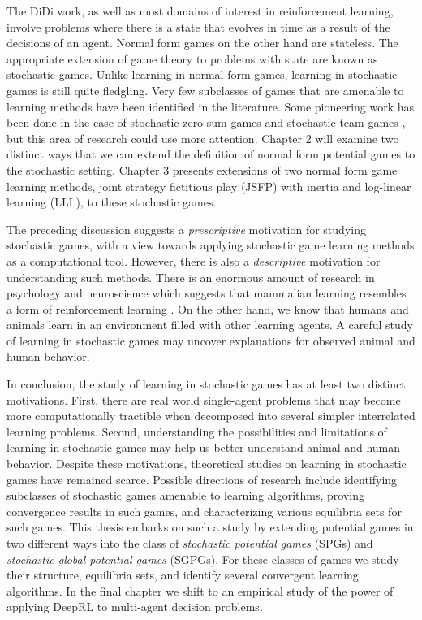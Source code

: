 The DiDi work, as well as most domains of interest in reinforcement learning, involve problems where there is a state that evolves in time as a result of the decisions of an agent. Normal form games on the other hand are stateless. The appropriate extension of game theory to problems with state are known as stochastic games. Unlike learning in normal form games, learning in stochastic games is still quite fledgling. Very few subclasses of games that are amenable to learning methods have been identified in the literature. Some pioneering work has been done in the case of stochastic zero-sum games \cite{zerosumstochastic} and stochastic team games \cite{arslan2016decentralized}, but this area of research could use more attention. Chapter 2 will examine two distinct ways that we can extend the definition of normal form potential games to the stochastic setting. Chapter 3 presents extensions of two normal form game learning methods, joint strategy fictitious play (JSFP) with inertia and log-linear learning (LLL), to these stochastic games.  


The preceding discussion suggests a {\em prescriptive} motivation for studying stochastic games, with a view towards applying stochastic game learning methods as a computational tool. However, there is also a {\em descriptive} motivation for understanding such methods. There is an enormous amount of research in psychology and neuroscience which suggests that mammalian learning resembles a form of reinforcement learning \cite{zald2004dopamine, pessiglione2006dopamine, rescorla1972theory}. On the other hand, we know that humans and animals learn in an environment filled with other learning agents. A careful study of learning in stochastic games may uncover explanations for observed animal and human behavior.


In conclusion, the study of learning in stochastic games has at least two distinct motivations. First, there are real world single-agent problems that may become more computationally tractible when decomposed into several simpler interrelated learning problems. Second, understanding the possibilities and limitations of learning in stochastic games may help us better understand animal and human behavior. Despite these motivations, theoretical studies on learning in stochastic games have remained scarce. Possible directions of research include identifying subclasses of stochastic games amenable to learning algorithms, proving convergence results in such games, and characterizing various equilibria sets for such games. This thesis embarks on such a study by extending potential games in two different ways into the class of {\em stochastic potential games} (SPGs) and {\em stochastic global potential games} (SGPGs). For these classes of games we study their structure, equilibria sets, and identify several convergent learning algorithms. In the final chapter we shift to an empirical study of the power of applying DeepRL to multi-agent decision problems.















